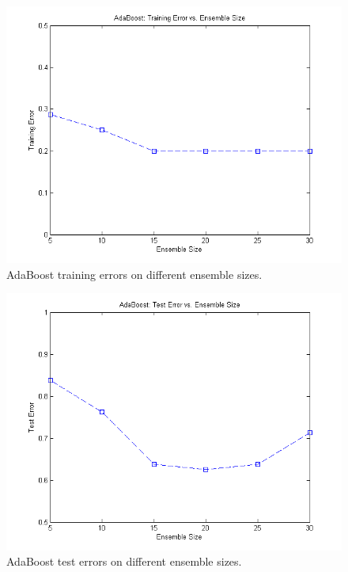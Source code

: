 \documentclass[12pt]{article}
\begin{document}
\begin{figure}[!t]
  \centering
  \includegraphics[scale=.75]{img/adaboost_trainerrors.png}
  \caption{AdaBoost training errors on different ensemble sizes.}
  \label{fig:adaboost_trainerrors}
\end{figure}

\begin{figure}[!t]
  \centering
  \includegraphics[scale=.75]{img/adaboost_testerrors.png}
  \caption{AdaBoost test errors on different ensemble sizes.}
  \label{fig:adaboost_testerrors}
\end{figure}
\end{document}
